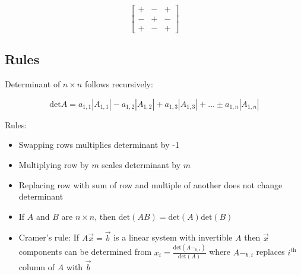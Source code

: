 \[\begin{bmatrix}+&-&+\\-&+&-\\+&-&+\end{bmatrix}\]

\subsection{Rules}

Determinant of $n\times n$ follows recursively:

\[\boxed{\mbox{det}A=a_{1,1}\left|A_{1,1}\right|-a_{1,2}\left|A_{1,2}\right|+a_{1,3}\left|A_{1,3}\right|+\dots\pm a_{1,n}\left|A_{1,n}\right|}\]

\noindent
Rules:
\begin{itemize}
    \item Swapping rows multiplies determinant by -1
    \item Multiplying row by $m$ scales determinant by $m$
    \item Replacing row with sum of row and multiple of another does not change determinant
    \item If $A$ and $B$ are $n\times n$, then $\mathrm{det}(AB)=\mathrm{det}(A)\mathrm{det}(B)$
    \item Cramer's rule: If $A\vec{x}=\vec{b}$ is a linear system with invertible $A$ then $\vec{x}$ components can be determined
    from $x_i=\frac{\mathrm{det}(A-_{b,i})}{\mathrm{det}(A)}$ where $A-_{b,i}$ replaces $i^{\mathrm{th}}$ column of $A$ with $\vec{b}$
\end{itemize}